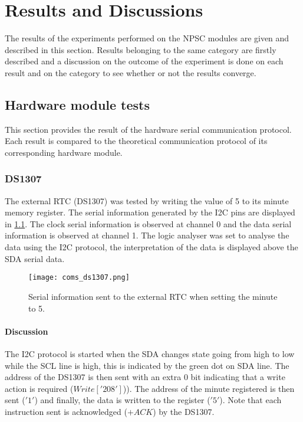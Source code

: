 \chapter{Results and Discussions}

The results of the experiments performed on the NPSC modules are given and described in this section. Results belonging to the same category are firstly described and a discussion on the outcome of the experiment is done on each result and on the category to see whether or not the results converge. 

\section{Hardware module tests}
This section provides the result of the hardware serial communication protocol. Each result is compared to the theoretical communication protocol of its corresponding hardware module. 

\subsection{DS1307}
The external RTC (DS1307) was tested by writing the value of 5 to its minute memory register. The serial information generated by the I2C pins are displayed in \cref{coms_ds1307}. The clock serial information is observed at channel 0 and the data serial information is observed at channel 1. The logic analyser was set to analyse the data using the I2C protocol, the interpretation of the data is displayed above the SDA serial data.
\begin{figure}[h!]
	\centering
	\texttt{[image: coms\_ds1307.png]}
	\caption{Serial information sent to the external RTC when setting the minute to 5.}
	\label{coms_ds1307}
\end{figure}
\subsubsection{Discussion}
The I2C protocol is started when the SDA changes state going from high to low while the SCL line is high, this is indicated by the green dot on SDA line. The address of the DS1307 is then sent with an extra 0 bit indicating that a write action is required ($Write['208']$)). The address of the minute registered is then sent ($'1'$) and finally, the data is written to the register ($'5'$). Note that each instruction sent is acknowledged ($+ACK$) by the DS1307.

